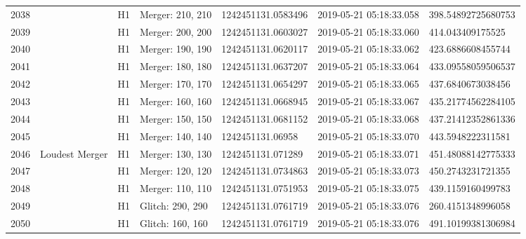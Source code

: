 \begin{longtable}{lllllll}
2038 &                                                    &       H1 &  Merger: 210, 210 &  1242451131.0583496 &  2019-05-21 05:18:33.058 &  398.54892725680753 \\
2039 &                                                    &       H1 &  Merger: 200, 200 &  1242451131.0603027 &  2019-05-21 05:18:33.060 &    414.043409175525 \\
2040 &                                                    &       H1 &  Merger: 190, 190 &  1242451131.0620117 &  2019-05-21 05:18:33.062 &   423.6886608455744 \\
2041 &                                                    &       H1 &  Merger: 180, 180 &  1242451131.0637207 &  2019-05-21 05:18:33.064 &  433.09558059506537 \\
2042 &                                                    &       H1 &  Merger: 170, 170 &  1242451131.0654297 &  2019-05-21 05:18:33.065 &   437.6840673038456 \\
2043 &                                                    &       H1 &  Merger: 160, 160 &  1242451131.0668945 &  2019-05-21 05:18:33.067 &  435.21774562284105 \\
2044 &                                                    &       H1 &  Merger: 150, 150 &  1242451131.0681152 &  2019-05-21 05:18:33.068 &  437.21412352861336 \\
2045 &                                                    &       H1 &  Merger: 140, 140 &    1242451131.06958 &  2019-05-21 05:18:33.070 &   443.5948222311581 \\
2046 &                                     Loudest Merger &       H1 &  Merger: 130, 130 &   1242451131.071289 &  2019-05-21 05:18:33.071 &  451.48088142775333 \\
2047 &                                                    &       H1 &  Merger: 120, 120 &  1242451131.0734863 &  2019-05-21 05:18:33.073 &   450.2743231721355 \\
2048 &                                                    &       H1 &  Merger: 110, 110 &  1242451131.0751953 &  2019-05-21 05:18:33.075 &   439.1159160499783 \\
2049 &                                                    &       H1 &  Glitch: 290, 290 &  1242451131.0761719 &  2019-05-21 05:18:33.076 &   260.4151348996058 \\
2050 &                                                    &       H1 &  Glitch: 160, 160 &  1242451131.0761719 &  2019-05-21 05:18:33.076 &  491.10199381306984 \\

\end{longtable}
